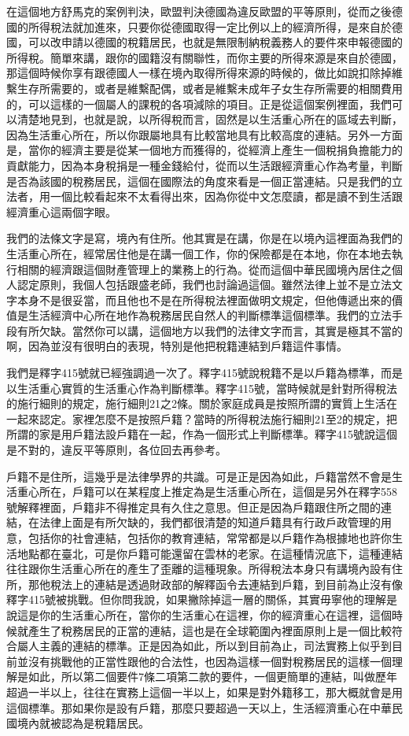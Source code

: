 \documentclass[]{ctexbook}
\begin{document}
在這個地方舒馬克的案例判決，歐盟判決德國為違反歐盟的平等原則，從而之後德國的所得稅法就加進來，只要你從德國取得一定比例以上的經濟所得，是來自於德國，可以改申請以德國的稅籍居民，也就是無限制納稅義務人的要件來申報德國的所得稅。簡單來講，跟你的國籍沒有關聯性，而你主要的所得來源是來自於德國，那這個時候你享有跟德國人一樣在境內取得所得來源的時候的，做比如說扣除掉維繫生存所需要的，或者是維繫配偶，或者是維繫未成年子女生存所需要的相關費用的，可以這樣的一個屬人的課稅的各項減除的項目。正是從這個案例裡面，我們可以清楚地見到，也就是說，以所得稅而言，固然是以生活重心所在的區域去判斷，因為生活重心所在，所以你跟屬地具有比較當地具有比較高度的連結。另外一方面是，當你的經濟主要是從某一個地方而獲得的，從經濟上產生一個稅捐負擔能力的貢獻能力，因為本身稅捐是一種金錢給付，從而以生活跟經濟重心作為考量，判斷是否為該國的稅務居民，這個在國際法的角度來看是一個正當連結。只是我們的立法者，用一個比較看起來不太看得出來，因為你從中文怎麼讀，都是讀不到生活跟經濟重心這兩個字眼。

我們的法條文字是寫，境內有住所。他其實是在講，你是在以境內這裡面為我們的生活重心所在，經常居住他是在講一個工作，你的保險都是在本地，你在本地去執行相關的經濟跟這個財產管理上的業務上的行為。從而這個中華民國境內居住之個人認定原則，我個人包括跟盛老師，我們也討論過這個。雖然法律上並不是立法文字本身不是很妥當，而且他也不是在所得稅法裡面做明文規定，但他傳遞出來的價值是生活經濟中心所在地作為稅務居民自然人的判斷標準這個標準。我們的立法手段有所欠缺。當然你可以講，這個地方以我們的法律文字而言，其實是極其不當的啊，因為並沒有很明白的表現，特別是他把稅籍連結到戶籍這件事情。

我們是釋字415號就已經強調過一次了。釋字415號說稅籍不是以戶籍為標準，而是以生活重心實質的生活重心作為判斷標準。釋字415號，當時候就是針對所得稅法的施行細則的規定，施行細則21之2條。關於家庭成員是按照所謂的實質上生活在一起來認定。家裡怎麼不是按照戶籍？當時的所得稅法施行細則21至2的規定，把所謂的家是用戶籍法設戶籍在一起，作為一個形式上判斷標準。釋字415號說這個是不對的，違反平等原則，各位回去再參考。

戶籍不是住所，這幾乎是法律學界的共識。可是正是因為如此，戶籍當然不會是生活重心所在，戶籍可以在某程度上推定為是生活重心所在，這個是另外在釋字558號解釋裡面，戶籍非不得推定具有久住之意思。但正是因為戶籍跟住所之間的連結，在法律上面是有所欠缺的，我們都很清楚的知道戶籍具有行政戶政管理的用意，包括你的社會連結，包括你的教育連結，常常都是以戶籍作為根據地也許你生活地點都在臺北，可是你戶籍可能還留在雲林的老家。在這種情況底下，這種連結往往跟你生活重心所在的產生了歪離的這種現象。所得稅法本身只有講境內設有住所，那他稅法上的連結是透過財政部的解釋函令去連結到戶籍，到目前為止沒有像釋字415號被挑戰。但你問我說，如果撇除掉這一層的關係，其實毋寧他的理解是說這是你的生活重心所在，當你的生活重心在這裡，你的經濟重心在這裡，這個時候就產生了稅務居民的正當的連結，這也是在全球範圍內裡面原則上是一個比較符合屬人主義的連結的標準。正是因為如此，所以到目前為止，司法實務上似乎到目前並沒有挑戰他的正當性跟他的合法性，也因為這樣一個對稅務居民的這樣一個理解是如此，所以第二個要件7條二項第二款的要件，一個更簡單的連結，叫做歷年超過一半以上，往往在實務上這個一半以上，如果是對外籍移工，那大概就會是用這個標準。那如果你是設有戶籍，那麼只要超過一天以上，生活經濟重心在中華民國境內就被認為是稅籍居民。
\end{document}
